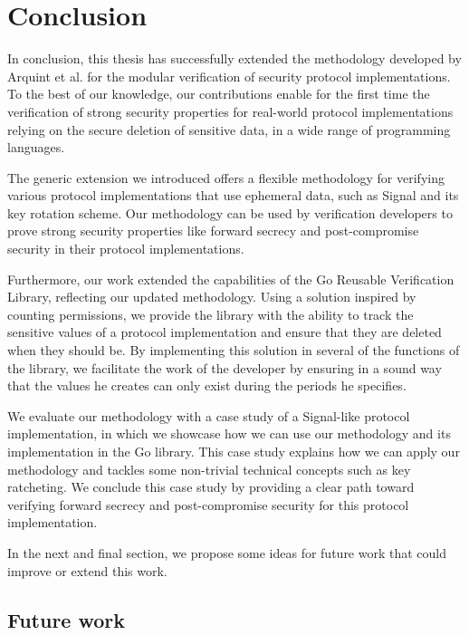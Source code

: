 \chapter{Conclusion}
\label{chap:conclusion}

In conclusion, this thesis has successfully extended the methodology developed by Arquint et al. for the modular verification of security protocol implementations.
To the best of our knowledge, our contributions enable for the first time the verification of strong security properties for real-world protocol implementations relying on the secure deletion of sensitive data, in a wide range of programming languages.

The generic extension we introduced offers a flexible methodology for verifying various protocol implementations that use ephemeral data, such as Signal and its key rotation scheme. Our methodology can be used by verification developers to prove strong security properties like forward secrecy and post-compromise security in their protocol implementations.

Furthermore, our work extended the capabilities of the Go Reusable Verification Library, reflecting our updated methodology.
Using a solution inspired by counting permissions, we provide the library with the ability to track the sensitive values of a protocol implementation and ensure that they are deleted when they should be.
By implementing this solution in several of the functions of the library, we facilitate the work of the developer by ensuring in a sound way that the values he creates can only exist during the periods he specifies.

We evaluate our methodology with a case study of a Signal-like protocol implementation, in which we showcase how we can use our methodology and its implementation in the Go library.
This case study explains how we can apply our methodology and tackles some non-trivial technical concepts such as key ratcheting.
We conclude this case study by providing a clear path toward verifying forward secrecy and post-compromise security for this protocol implementation.

In the next and final section, we propose some ideas for future work that could improve or extend this work.

\section{Future work}
\label{sec:future-work}

